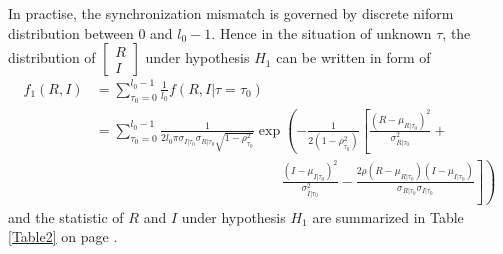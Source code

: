 In practise, the synchronization mismatch is governed by discrete niform distribution between $0$ and $l_0-1$. Hence in the situation of unknown $\tau$, the distribution of  
$\begin{bmatrix}
  R \\
  I
\end{bmatrix}$
under hypothesis $H_1$ can be written in form of 
\begin{equation}
  \begin{split}
	f_1(R, I) &= \sum_{\tau_0 = 0}^{l_0-1} \frac{1}{l_0}f(R, I|\tau=\tau_0)\\
	&= \sum_{\tau_0 = 0}^{l_0-1}\frac{1}{2l_0\pi\sigma_{I|\tau_0}\sigma_{R|\tau_0}\sqrt{1 - \rho_{\tau_0}^2}}\exp\left( -\frac{1}{2(1-\rho_{\tau_0}^2)}\left[ \frac{(R-\mu_{R|\tau_0})^2}{\sigma_{R|\tau_0}^2} + \right.\right.\\
	& \left. \left. \;\;\;\;\;\;\;\;\;\;\;\;\;\;\;\; \;\;\;\;\;\;\;\;\;\;\;\;\;\;\;\; \;\;\;\;\;\;\;\;\;\;\;\;\;\;\;\; \frac{(I-\mu_{I|\tau_0})^2}{\sigma_{I|\tau_0}^2} - \frac{2\rho(R-\mu_{R|\tau_0})(I-\mu_{I|\tau_0})}{\sigma_{R|\tau_0}\sigma_{I|\tau_0}}\right] \right)
  \end{split}
  \label{f_1underH1}
\end{equation}
and the statistic of $R$ and $I$  under hypothesis $H_1$ are summarized in Table \ref{Table2} on page \pageref{Table2}.

